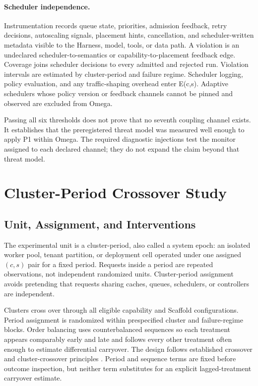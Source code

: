 \paragraph{Scheduler independence.}
Instrumentation records queue state, priorities, admission feedback, retry decisions, autoscaling signals, placement hints, cancellation, and scheduler-written metadata visible to the Harness, model, tools, or data path. A violation is an undeclared scheduler-to-semantics or capability-to-placement feedback edge. Coverage joins scheduler decisions to every admitted and rejected run. Violation intervals are estimated by cluster-period and failure regime. Scheduler logging, policy evaluation, and any traffic-shaping overhead enter E(c,s). Adaptive schedulers whose policy version or feedback channels cannot be pinned and observed are excluded from Omega.

Passing all six thresholds does not prove that no seventh coupling channel exists. It establishes that the preregistered threat model was measured well enough to apply P1 within Omega. The required diagnostic injections test the monitor assigned to each declared channel; they do not expand the claim beyond that threat model.

\section{Cluster-Period Crossover Study}
\label{sec:evaluation}

\subsection{Unit, Assignment, and Interventions}

The experimental unit is a cluster-period, also called a system epoch: an isolated worker pool, tenant partition, or deployment cell operated under one assigned $(c,s)$ pair for a fixed period. Requests inside a period are repeated observations, not independent randomized units. Cluster-period assignment avoids pretending that requests sharing caches, queues, schedulers, or controllers are independent.

Clusters cross over through all eligible capability and Scaffold configurations. Period assignment is randomized within prespecified cluster and failure-regime blocks. Order balancing uses counterbalanced sequences so each treatment appears comparably early and late and follows every other treatment often enough to estimate differential carryover. The design follows established crossover and cluster-crossover principles \cite{jones2014crossover,turner2007cluster}. Period and sequence terms are fixed before outcome inspection, but neither term substitutes for an explicit lagged-treatment carryover estimate.

